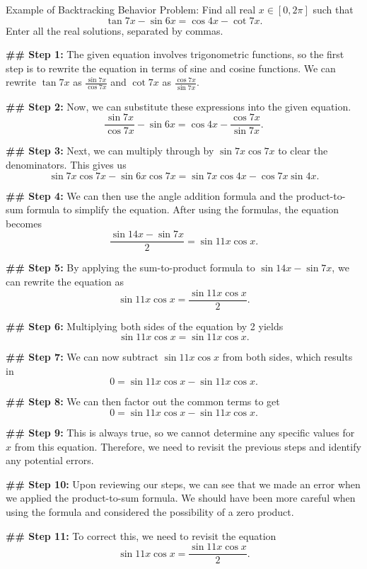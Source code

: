 \begin{promptbox}{Example of Backtracking Behavior}
Problem: Find all real $x \in [0, 2 \pi]$ such that
\[\tan 7x - \sin 6x = \cos 4x - \cot 7x.\]
Enter all the real solutions, separated by commas.

\textbf{\#\# Step 1:} The given equation involves trigonometric functions, so the first step is to rewrite the equation in terms of sine and cosine functions. We can rewrite $\tan 7x$ as $\frac{\sin 7x}{\cos 7x}$ and $\cot 7x$ as $\frac{\cos 7x}{\sin 7x}.$

\textbf{\#\# Step 2:} Now, we can substitute these expressions into the given equation.
\[\frac{\sin 7x}{\cos 7x} - \sin 6x = \cos 4x - \frac{\cos 7x}{\sin 7x}.\]

\textbf{\#\# Step 3:} Next, we can multiply through by $\sin 7x \cos 7x$ to clear the denominators. This gives us
\[\sin 7x \cos 7x - \sin 6x \cos 7x = \sin 7x \cos 4x - \cos 7x \sin 4x.\]

\textbf{\#\# Step 4:} We can then use the angle addition formula and the product-to-sum formula to simplify the equation. After using the formulas, the equation becomes
\[\frac{\sin 14x - \sin 7x}{2} = \sin 11x \cos x.\]

\textbf{\#\# Step 5:} By applying the sum-to-product formula to $\sin 14x - \sin 7x$, we can rewrite the equation as
\[\sin 11x \cos x = \frac{\sin 11x \cos x}{2}.\]

\textbf{\#\# Step 6:} Multiplying both sides of the equation by 2 yields
\[\sin 11x \cos x = \sin 11x \cos x.\]

\textbf{\#\# Step 7:} We can now subtract $\sin 11x \cos x$ from both sides, which results in
\[0 = \sin 11x \cos x - \sin 11x \cos x.\]

\textbf{\#\# Step 8:} We can then factor out the common terms to get
\[0 = \sin 11x \cos x - \sin 11x \cos x.\]

\textbf{\#\# Step 9:} {\color{red} This is always true, so we cannot determine any specific values for $x$ from this equation. Therefore, we need to revisit the previous steps and identify any potential errors.}

\textbf{\#\# Step 10:} Upon reviewing our steps, we can see that we made an error when we applied the product-to-sum formula. We should have been more careful when using the formula and considered the possibility of a zero product.

\textbf{\#\# Step 11:} To correct this, we need to revisit the equation
\[\sin 11x \cos x = \frac{\sin 11x \cos x}{2}.\]


\end{promptbox}
